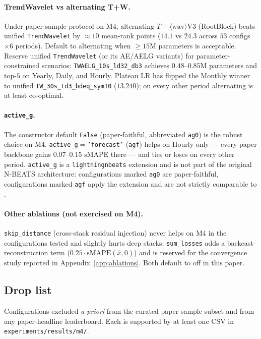 \documentclass{article}
\begin{document}
\paragraph{TrendWavelet vs alternating T+W.} Under paper-sample protocol on M4, alternating $T{+}\langle\text{wav}\rangle$V3 (RootBlock) beats unified \texttt{TrendWavelet} by $\approx 10$ mean-rank points ($14.1$ vs $24.3$ across $53$ configs $\times 6$ periods). Default to alternating when $\geq 15$M parameters is acceptable. Reserve unified \texttt{TrendWavelet} (or its AE/AELG variants) for parameter-constrained scenarios: \texttt{TWAELG\_10s\_ld32\_db3} achieves $0.48$--$0.85$M parameters and top-$5$ on Yearly, Daily, and Hourly. Plateau LR has flipped the Monthly winner to unified \texttt{TW\_30s\_td3\_bdeq\_sym10} ($13.240$); on every other period alternating is at least co-optimal.

\paragraph{\texttt{active\_g}.} The constructor default \texttt{False} (paper-faithful, abbreviated \texttt{ag0}) is the robust choice on M4. \texttt{active\_g}$=$\texttt{'forecast'} (\texttt{agf}) helps on Hourly only --- every paper backbone gains $0.07$--$0.15$ sMAPE there --- and ties or loses on every other period. \texttt{active\_g} is a \texttt{lightningnbeats} extension and is not part of the original N-BEATS architecture: configurations marked \texttt{ag0} are paper-faithful, configurations marked \texttt{agf} apply the extension and are not strictly comparable to \citet{oreshkin2020nbeats}.

\paragraph{Other ablations (not exercised on M4).} \texttt{skip\_distance} (cross-stack residual injection) never helps on M4 in the configurations tested and slightly hurts deep stacks; \texttt{sum\_losses} adds a backcast-reconstruction term ($0.25 \cdot \mathrm{sMAPE}(\hat{x}, 0)$) and is reserved for the convergence study reported in Appendix~\ref{app:ablations}. Both default to off in this paper.

\subsection{Drop list}
\label{app:hyperparams:drop}

Configurations excluded \emph{a priori} from the curated paper-sample subset and from any paper-headline leaderboard. Each is supported by at least one CSV in \texttt{experiments/results/m4/}.
\end{document}
